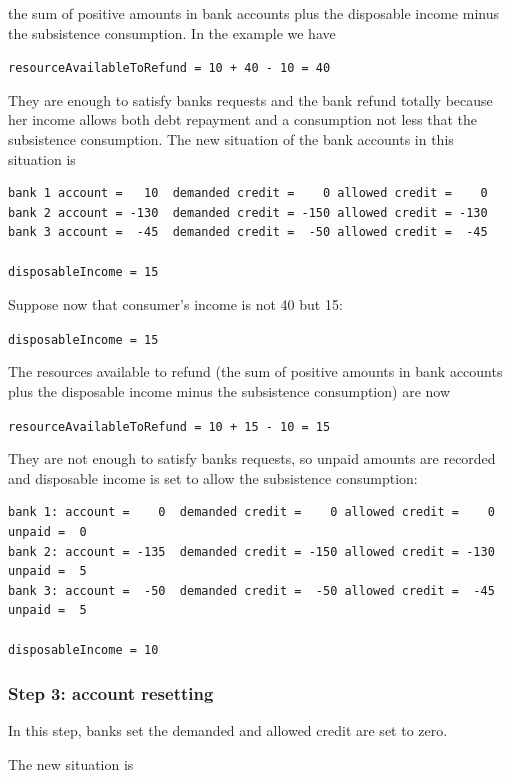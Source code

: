\documentclass{article}
\begin{document}
the sum of positive amounts in bank accounts plus the disposable income minus the subsistence consumption. In the example we have

\verb/resourceAvailableToRefund = 10 + 40 - 10 = 40/

They are enough to satisfy banks requests and 
the bank refund totally because her income allows both debt repayment and a consumption not less that the subsistence consumption. 
The new situation of the bank accounts in this situation is

\begin{verbatim}
bank 1 account =   10  demanded credit =    0 allowed credit =    0
bank 2 account = -130  demanded credit = -150 allowed credit = -130 
bank 3 account =  -45  demanded credit =  -50 allowed credit =  -45

disposableIncome = 15
\end{verbatim}



Suppose now that consumer's income is not 40 but 15:

\verb+disposableIncome = 15+

The resources available to refund (the sum of positive amounts in bank accounts plus the disposable income minus the subsistence consumption) are now

\verb/resourceAvailableToRefund = 10 + 15 - 10 = 15/

They are not enough to satisfy banks requests, so unpaid amounts are recorded and disposable income is set to allow the subsistence consumption:

\begin{verbatim}
bank 1: account =    0  demanded credit =    0 allowed credit =    0 unpaid =  0
bank 2: account = -135  demanded credit = -150 allowed credit = -130 unpaid =  5
bank 3: account =  -50  demanded credit =  -50 allowed credit =  -45 unpaid =  5

disposableIncome = 10
\end{verbatim}

\subsubsection*{Step 3: account resetting}
In this step, banks set the demanded and allowed credit are set to zero.

The new situation is
\end{document}
